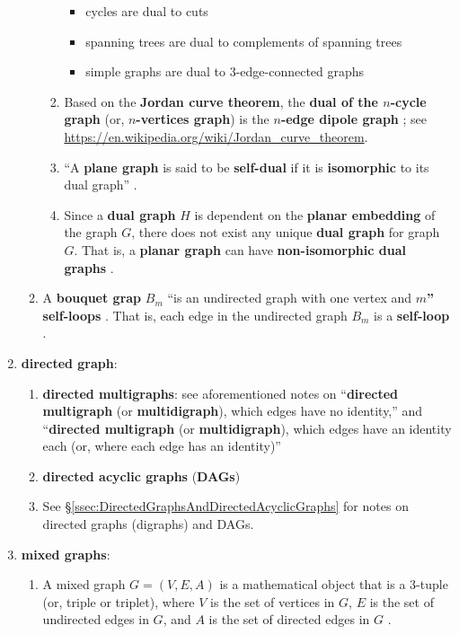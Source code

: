 \begin{enumerate}
\begin{enumerate}
\begin{enumerate}
			\begin{itemize}
			\item cycles are dual to cuts
			\item spanning trees are dual to complements of spanning trees
			\item simple graphs are dual to 3-edge-connected graphs
			\end{itemize}
		\item Based on the {\bf Jordan curve theorem}, the {\bf dual of the $n$-cycle graph} (or, {\bf $n$-vertices graph}) is the {\bf $n$-edge dipole graph} \cite{WikipediaContributors2018a48}; see \url{https://en.wikipedia.org/wiki/Jordan_curve_theorem}.
		\item ``A {\bf plane graph} is said to be {\bf self-dual} if it is {\bf isomorphic} to its dual graph'' \cite{WikipediaContributors2018a48}.
		\item Since a {\bf dual graph} $H$ is dependent on the {\bf planar embedding} of the graph $G$, there does not exist any unique {\bf dual graph} for graph $G$. That is, a {\bf planar graph} can have {\bf non-isomorphic dual graphs} \cite{WikipediaContributors2018a48}.
		\end{enumerate}
	\item A {\bf bouquet grap} $B_{m}$ ``is an undirected graph with one vertex and {\bf $m$'' self-loops} \cite{WikipediaContributors2018a47}. That is, each edge in the undirected graph  $B_{m}$ is a {\bf self-loop} \cite{WikipediaContributors2017a13}.
	\end{enumerate}
\item {\bf directed graph}: \vspace{-0.3cm}
	\begin{enumerate} \itemsep -2pt
	\item {\bf directed multigraphs}: see aforementioned notes on ``{\bf directed multigraph} (or {\bf multidigraph}), which edges have no identity,'' and ``{\bf directed multigraph} (or {\bf multidigraph}), which edges have an identity each (or, where each edge has an identity)''
	\item {\bf directed acyclic graphs} ({\bf DAGs})
	\item See \S\ref{ssec:DirectedGraphsAndDirectedAcyclicGraphs} for notes on directed graphs (digraphs) and DAGs.
	\end{enumerate}
\item {\bf mixed graphs}: \vspace{-0.3cm}
	\begin{enumerate} \itemsep -2pt
	\item A mixed graph $G = (V, E, A)$ is a mathematical object that is a 3-tuple (or, triple or triplet), where $V$ is the set of vertices in $G$, $E$ is the set of undirected edges in $G$, and $A$ is the set of directed edges in $G$ \cite{WikipediaContributors2018a50}.

\end{enumerate}
\end{enumerate}

